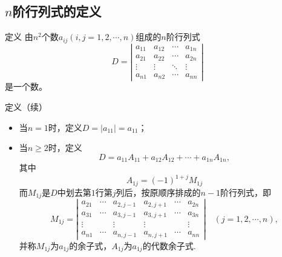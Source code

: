 \subsection{$n$阶行列式的定义}

\begin{frame}
  \begin{block}{定义}
    由$n^2$个数$a_{ij}(i,j=1,2,\cdots,n)$组成的$n$阶行列式
    \begin{equation}\label{Dn}
      D = \left|
      \begin{array}{cccc}
        a_{11}  &  a_{12} & \cdots & a_{1n} \\
        a_{21}  &  a_{22} & \cdots & a_{2n} \\
        \vdots & \vdots & \ddots & \vdots\\  
        a_{n1}  &  a_{n2} & \cdots & a_{nn} 
      \end{array}
      \right|
    \end{equation}
    是一个数。
  \end{block}
\end{frame}

\begin{frame}
  \begin{block}{定义（续）}
    \begin{itemize}
    \item 当$n=1$时，定义$D=|a_{11}|=a_{11}$；\pause 
    \item 当$n\ge2$时，定义
      \begin{equation}
        D = a_{11} A_{11} + a_{12} A_{12} + \cdots + a_{1n} A_{1n},
      \end{equation}
      其中
      $$A_{1j} = (-1)^{1+j} M_{1j}$$
      而$M_{1j}$是$D$中划去第$1$行第$j$列后，按原顺序排成的$n-1$阶行列式，即
      $$
      M_{1j} =   \left|
      \begin{array}{cccccc}
        a_{21}  & \cdots&  a_{2,j-1}  &  a_{2,j+1}  & \cdots & a_{2n} \\
        a_{31}  & \cdots&  a_{3,j-1}  &  a_{3,j+1}  & \cdots & a_{3n} \\
        \vdots &       &  \vdots &  \vdots &  & \vdots\\  
        a_{n1}  & \cdots&  a_{n,j-1}  &  a_{n,j+1}  & \cdots & a_{nn} 
      \end{array}
      \right| \quad (j = 1,2,\cdots, n),
      $$
      并称$M_{1j}$为$a_{1j}$的余子式，$A_{1j}$为$a_{1j}$的代数余子式.
    \end{itemize}
  \end{block}

\end{frame}



